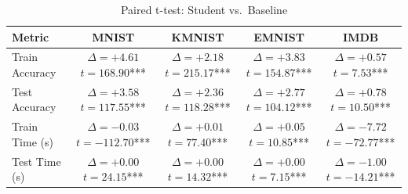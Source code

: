\begin{table}
\caption{Paired t-test: Student vs.\ Baseline}
\label{tab:ttest-dkd}
\begin{tabular}{|l|c|c|c|c|}
\hline
Metric & MNIST & KMNIST & EMNIST & IMDB \\
\hline
Train Accuracy & $\Delta = +4.61$ \newline $t = 168.90$*** & $\Delta = +2.18$ \newline $t = 215.17$*** & $\Delta = +3.83$ \newline $t = 154.87$*** & $\Delta = +0.57$ \newline $t = 7.53$*** \\\hline
Test Accuracy & $\Delta = +3.58$ \newline $t = 117.55$*** & $\Delta = +2.36$ \newline $t = 118.28$*** & $\Delta = +2.77$ \newline $t = 104.12$*** & $\Delta = +0.78$ \newline $t = 10.50$*** \\\hline
Train Time (s) & $\Delta = -0.03$ \newline $t = -112.70$*** & $\Delta = +0.01$ \newline $t = 77.40$*** & $\Delta = +0.05$ \newline $t = 10.85$*** & $\Delta = -7.72$ \newline $t = -72.77$*** \\\hline
Test Time (s) & $\Delta = +0.00$ \newline $t = 24.15$*** & $\Delta = +0.00$ \newline $t = 14.32$*** & $\Delta = +0.00$ \newline $t = 7.15$*** & $\Delta = -1.00$ \newline $t = -14.21$*** \\\hline
\end{tabular}
\end{table}